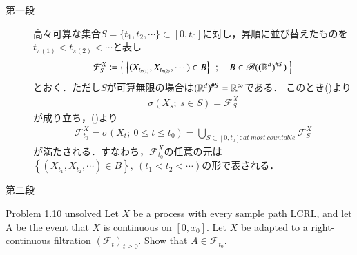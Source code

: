 \begin{prf}\mbox{}
	\begin{description}
		\item[第一段]
			高々可算な集合$S = \{t_1,t_2,\cdots\} \subset [0,t_0]$に対し，昇順に並び替えたものを
			$t_{\pi(1)} < t_{\pi(2)} < \cdots$と表し
			\begin{align}
				\mathcal{F}^X_S \coloneqq 
				\left\{\ \left\{(X_{t_{\pi(1)}},X_{t_{\pi(2)}},\cdots) \in B \right\}\ \, ; \quad B \in \mathscr{B}((\mathbb{R}^d)^{\# S})\ \right\}
			\end{align}
			とおく．ただし$S$が可算無限の場合は$(\mathbb{R}^d)^{\# S} = \mathbb{R}^\infty$である．
			このとき()より
			\begin{align}
				\sigma(X_s;\ s \in S) = \mathcal{F}^X_S
			\end{align}
			が成り立ち，()より
			\begin{align}
				\mathscr{F}^X_{t_0}
				= \sigma(X_t;\ 0 \leq t \leq t_0)
				= \bigcup_{S \subset [0,t_0]:at\ most\ countable} \mathcal{F}^X_S
			\end{align}
			が満たされる．すなわち，$\mathscr{F}^X_{t_0}$の任意の元は
			$\left\{(X_{t_1},X_{t_2},\cdots) \in B \right\},\ (t_1 < t_2 < \cdots)$の形で表される．
			
		\item[第二段]
	\end{description}
\end{prf}

\begin{itembox}[l]{Problem 1.10 unsolved}
		Let $X$ be a process with every sample path LCRL, and 
		let A be the event that $X$ is continuous on $[0,x_0]$.
		Let $X$ be adapted to a right-continuous filtration 
		$(\mathscr{F}_t)_{t \geq 0}$. Show that $A \in \mathscr{F}_{t_0}$.
\end{itembox}

